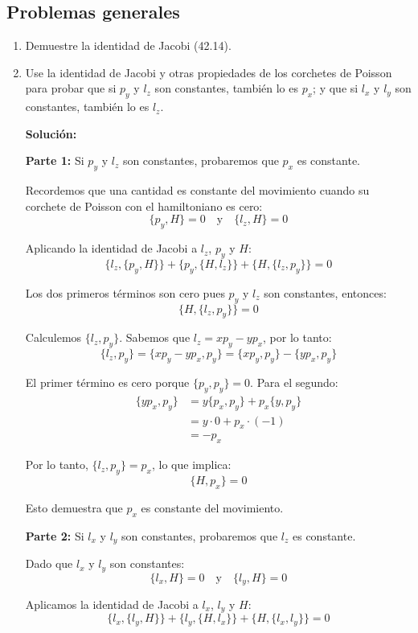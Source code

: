 \documentclass[12pt]{article}
\begin{document}
\subsection*{Problemas generales}
\begin{enumerate}
  \item Demuestre la identidad de Jacobi (42.14).
  \item Use la identidad de Jacobi y otras propiedades de los corchetes de Poisson para probar que si \(p_y\) y \(l_z\) son constantes, también lo es \(p_x\); y que si \(l_x\) y \(l_y\) son constantes, también lo es \(l_z\).

  \textbf{Solución:}

  \textbf{Parte 1:} Si \(p_y\) y \(l_z\) son constantes, probaremos que \(p_x\) es constante.

  Recordemos que una cantidad es constante del movimiento cuando su corchete de Poisson con el hamiltoniano es cero:
  \[
  \{p_y,H\} = 0 \quad \text{y} \quad \{l_z,H\} = 0
  \]

  Aplicando la identidad de Jacobi a \(l_z\), \(p_y\) y \(H\):
  \[
  \{l_z,\{p_y,H\}\} + \{p_y,\{H,l_z\}\} + \{H,\{l_z,p_y\}\} = 0
  \]

  Los dos primeros términos son cero pues \(p_y\) y \(l_z\) son constantes, entonces:
  \[
  \{H,\{l_z,p_y\}\} = 0
  \]

  Calculemos \(\{l_z,p_y\}\). Sabemos que \(l_z = xp_y - yp_x\), por lo tanto:
  \[
  \{l_z,p_y\} = \{xp_y - yp_x, p_y\} = \{xp_y,p_y\} - \{yp_x,p_y\}
  \]

  El primer término es cero porque \(\{p_y,p_y\} = 0\). Para el segundo:
  \begin{align*}
  \{yp_x,p_y\} &= y\{p_x,p_y\} + p_x\{y,p_y\} \\
  &= y \cdot 0 + p_x \cdot (-1) \\
  &= -p_x
  \end{align*}

  Por lo tanto, \(\{l_z,p_y\} = p_x\), lo que implica:
  \[
  \{H,p_x\} = 0
  \]

  Esto demuestra que \(p_x\) es constante del movimiento.

  \textbf{Parte 2:} Si \(l_x\) y \(l_y\) son constantes, probaremos que \(l_z\) es constante.

  Dado que \(l_x\) y \(l_y\) son constantes:
  \[
  \{l_x,H\} = 0 \quad \text{y} \quad \{l_y,H\} = 0
  \]

  Aplicamos la identidad de Jacobi a \(l_x\), \(l_y\) y \(H\):
  \[
  \{l_x,\{l_y,H\}\} + \{l_y,\{H,l_x\}\} + \{H,\{l_x,l_y\}\} = 0
  \]


\end{enumerate}
\end{document}

